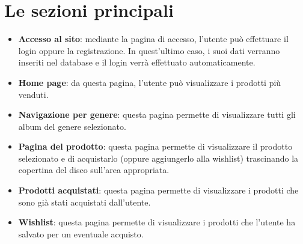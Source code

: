 \section{Le sezioni principali}
\begin{itemize}
    \item \textbf{Accesso al sito}: mediante la pagina di accesso, l'utente può effettuare il login oppure la registrazione. In quest'ultimo caso, i suoi dati verranno inseriti nel database e il login verrà effettuato automaticamente. 
    \item \textbf{Home page}: da questa pagina, l'utente può visualizzare i prodotti più venduti.
    \item \textbf{Navigazione per genere}: questa pagina permette di visualizzare tutti gli album del genere selezionato.
    \item \textbf{Pagina del prodotto}: questa pagina permette di visualizzare il prodotto selezionato e di acquistarlo (oppure aggiungerlo alla wishlist) trascinando la copertina del disco sull'area appropriata.
    \item \textbf{Prodotti acquistati}: questa pagina permette di visualizzare i prodotti che sono già stati acquistati dall'utente.
    \item \textbf{Wishlist}: questa pagina permette di visualizzare i prodotti che l'utente ha salvato per un eventuale acquisto.
\end{itemize}